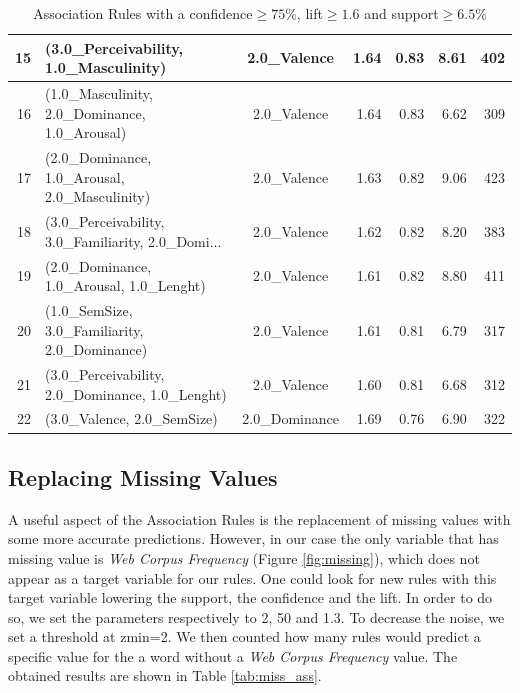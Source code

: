 \documentclass[a4paper,11pt,dvipsnames]{article}
\begin{document}
\begin{table}[h]
{\begin{tabular}{|r|l|c|r|r|r|r|}
15 &              (3.0\_Perceivability, 1.0\_Masculinity) &         2.0\_Valence &  1.64 &  0.83 &      8.61 &   402 \\\hline
16 &      (1.0\_Masculinity, 2.0\_Dominance, 1.0\_Arousal) &         2.0\_Valence &  1.64 &  0.83 &      6.62 &   309 \\\hline
17 &      (2.0\_Dominance, 1.0\_Arousal, 2.0\_Masculinity) &         2.0\_Valence &  1.63 &  0.82 &      9.06 &   423 \\\hline
18 &  (3.0\_Perceivability, 3.0\_Familiarity, 2.0\_Domi... &         2.0\_Valence &  1.62 &  0.82 &      8.20 &   383 \\\hline
19 &           (2.0\_Dominance, 1.0\_Arousal, 1.0\_Lenght) &         2.0\_Valence &  1.61 &  0.82 &      8.80 &   411 \\\hline
20 &      (1.0\_SemSize, 3.0\_Familiarity, 2.0\_Dominance) &         2.0\_Valence &  1.61 &  0.81 &      6.79 &   317 \\\hline
21 &    (3.0\_Perceivability, 2.0\_Dominance, 1.0\_Lenght) &         2.0\_Valence &  1.60 &  0.81 &      6.68 &   312 \\\hline
22 &                         (3.0\_Valence, 2.0\_SemSize) &       2.0\_Dominance &  1.69 &  0.76 &      6.90 &   322 \\
\bottomrule
\end{tabular}
}
        \caption{Association Rules with a confidence$\geq75\%$, lift$\geq1.6$ and support$\geq6.5\%$}\label{tab:rules}

\end{table}

\subsection{Replacing Missing Values}
A useful aspect of the Association Rules is the replacement of missing values with some more accurate predictions. However, in our case the only variable that has missing value is \textit{Web Corpus Frequency} (Figure \ref{fig:missing}), which does not appear as a target variable for our rules. One could look for new rules with this target variable lowering the support, the confidence and the lift. In order to do so, we set the parameters respectively to 2, 50 and 1.3. To decrease the noise, we set a threshold at zmin=2. We then counted how many rules would predict a specific value for the a word without a \textit{Web Corpus Frequency} value. The obtained results are shown in Table \ref{tab:miss_ass}.
\end{document}
